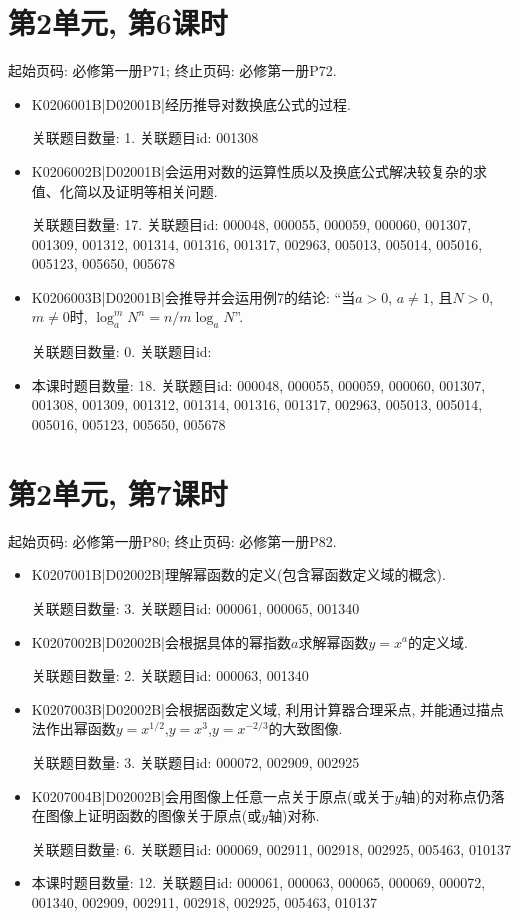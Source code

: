 \section*{第2单元, 第6课时}
起始页码: 必修第一册P71; 终止页码: 必修第一册P72.
\begin{itemize}
\item K0206001B|D02001B|经历推导对数换底公式的过程.

关联题目数量: 1. 关联题目id: 001308

\item K0206002B|D02001B|会运用对数的运算性质以及换底公式解决较复杂的求值、化简以及证明等相关问题.

关联题目数量: 17. 关联题目id: 000048, 000055, 000059, 000060, 001307, 001309, 001312, 001314, 001316, 001317, 002963, 005013, 005014, 005016, 005123, 005650, 005678

\item K0206003B|D02001B|会推导并会运用例7的结论: ``当$a>0$, $a\neq1$, 且$N>0$, $m\neq0$时, $\log_a^{m}N^{n}=n/m\log_aN$''.

关联题目数量: 0. 关联题目id: 

\item 本课时题目数量: 18. 关联题目id: 000048, 000055, 000059, 000060, 001307, 001308, 001309, 001312, 001314, 001316, 001317, 002963, 005013, 005014, 005016, 005123, 005650, 005678

\end{itemize}

\section*{第2单元, 第7课时}
起始页码: 必修第一册P80; 终止页码: 必修第一册P82.
\begin{itemize}
\item K0207001B|D02002B|理解幂函数的定义(包含幂函数定义域的概念).

关联题目数量: 3. 关联题目id: 000061, 000065, 001340

\item K0207002B|D02002B|会根据具体的幂指数$a$求解幂函数$y=x^{a}$的定义域.

关联题目数量: 2. 关联题目id: 000063, 001340

\item K0207003B|D02002B|会根据函数定义域, 利用计算器合理采点, 并能通过描点法作出幂函数$y=x^{1/2}$,$y=x^{3}$,$y=x^{-2/3}$的大致图像.

关联题目数量: 3. 关联题目id: 000072, 002909, 002925

\item K0207004B|D02002B|会用图像上任意一点关于原点(或关于$y$轴)的对称点仍落在图像上证明函数的图像关于原点(或$y$轴)对称.

关联题目数量: 6. 关联题目id: 000069, 002911, 002918, 002925, 005463, 010137

\item 本课时题目数量: 12. 关联题目id: 000061, 000063, 000065, 000069, 000072, 001340, 002909, 002911, 002918, 002925, 005463, 010137

\end{itemize}

